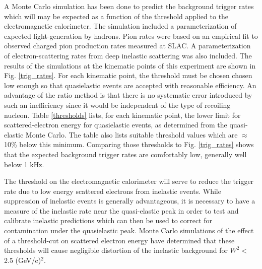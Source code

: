 \documentclass[12pt,letterpaper,oneside]{article}
\begin{document}

A Monte Carlo\cite{Seamus} simulation has been done to predict the background trigger rates
which will may be expected as a function of the threshold applied to
the electromagnetic calorimeter.  The simulation included a
parameterization of expected light-generation by hadrons.
Pion rates were based on an empirical fit to
observed charged pion production rates measured at SLAC.  A
parameterization of electron-scattering rates from deep
inelastic scattering was also included.
The results of the simulations at the kinematic points of this
experiment are shown in Fig. \ref{trig_rates}. 
For each kinematic point, the 
threshold must be chosen chosen low enough so that quasielastic events
are accepted with reasonable efficiency.  An advantage of the ratio
method is that there is no systematic error introduced by such an
inefficiency since it would be independent of the type of recoiling
nucleon.  Table \ref{thresholds} lists, for each kinematic point, the
lower limit for scattered-electron energy for quasielastic events, as
determined from the quasi-elastic Monte Carlo.  The table also lists
suitable threshold values which are $\approx$10\% below this minimum.
Comparing those thresholds to Fig. \ref{trig_rates} shows that the
expected background trigger rates are comfortably low, generally well
below 1 kHz.  

The threshold on the electromagnetic calorimeter will serve to reduce
the trigger rate due to low energy scattered 
electrons from inelastic events.  While suppression of
inelastic events is generally advantageous, it is necessary to have a
measure of the inelastic rate near the quasi-elastic peak in order to
test and calibrate inelastic predictions which can then be used to
correct for contamination under the quasielastic peak.  Monte Carlo
simulations of the effect of a threshold-cut on scattered electron
energy have determined that these thresholds will cause negligible
distortion of the inelastic background for $W^2<$ 2.5 (GeV/c)$^2$.

\end{document}
